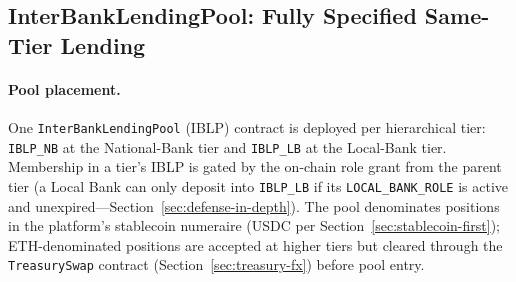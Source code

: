 \documentclass[12pt,a4paper]{report}
\begin{document}
\subsection{InterBankLendingPool: Fully Specified Same-Tier Lending}
\label{sec:interbank-pool}

\paragraph{Pool placement.}
One \texttt{InterBankLendingPool} (IBLP) contract is deployed per hierarchical tier: \texttt{IBLP\_NB} at the National-Bank tier and \texttt{IBLP\_LB} at the Local-Bank tier. Membership in a tier's IBLP is gated by the on-chain role grant from the parent tier (a Local Bank can only deposit into \texttt{IBLP\_LB} if its \texttt{LOCAL\_BANK\_ROLE} is active and unexpired---Section~\ref{sec:defense-in-depth}). The pool denominates positions in the platform's stablecoin numeraire (USDC per Section~\ref{sec:stablecoin-first}); ETH-denominated positions are accepted at higher tiers but cleared through the \texttt{TreasurySwap} contract (Section~\ref{sec:treasury-fx}) before pool entry.
\end{document}
